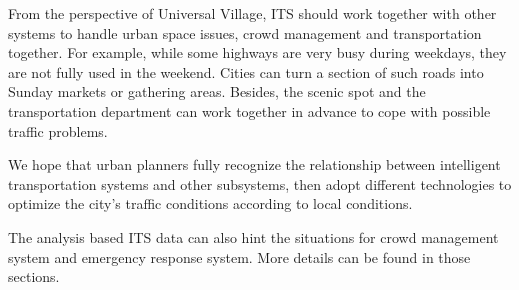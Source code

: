 \documentclass[letterpaper, twocolumn, 10pt, conference]{IEEEtran}
\begin{document}
From the perspective of Universal Village, ITS should work together with other systems to handle urban space issues, crowd management and transportation together. 
For example, while some highways are very busy during weekdays, they are not fully used in the weekend. Cities can turn a section of such roads into Sunday markets or gathering areas. Besides, the scenic spot and the transportation department can work together in advance to cope with possible traffic problems.

We hope that urban planners fully recognize the relationship between intelligent transportation systems and other subsystems, then adopt different technologies to optimize the city's traffic conditions according to local conditions.





The analysis based ITS data can also hint the situations for crowd management system and emergency response system. More details can be found in those sections.





\end{document}
